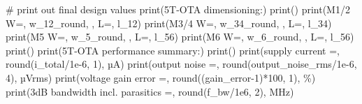 \documentclass[
  a4paper,
  DIV=11,
  numbers=noendperiod]{scrartcl}
\newenvironment{Shaded}{\begin{snugshade}}{\end{snugshade}}
\newcommand{\BuiltInTok}[1]{\textcolor[rgb]{0.00,0.23,0.31}{#1}}
\newcommand{\CommentTok}[1]{\textcolor[rgb]{0.37,0.37,0.37}{#1}}
\newcommand{\DecValTok}[1]{\textcolor[rgb]{0.68,0.00,0.00}{#1}}
\newcommand{\FloatTok}[1]{\textcolor[rgb]{0.68,0.00,0.00}{#1}}
\newcommand{\NormalTok}[1]{\textcolor[rgb]{0.00,0.23,0.31}{#1}}
\newcommand{\OperatorTok}[1]{\textcolor[rgb]{0.37,0.37,0.37}{#1}}
\newcommand{\StringTok}[1]{\textcolor[rgb]{0.13,0.47,0.30}{#1}}
\begin{document}
\begin{tcolorbox}
\begin{Shaded}
\begin{Highlighting}[]
\CommentTok{\# print out final design values}
\BuiltInTok{print}\NormalTok{(}\StringTok{\textquotesingle{}5T{-}OTA dimensioning:\textquotesingle{}}\NormalTok{)}
\BuiltInTok{print}\NormalTok{(}\StringTok{\textquotesingle{}{-}{-}{-}{-}{-}{-}{-}{-}{-}{-}{-}{-}{-}{-}{-}{-}{-}{-}{-}{-}\textquotesingle{}}\NormalTok{)}
\BuiltInTok{print}\NormalTok{(}\StringTok{\textquotesingle{}M1/2 W=\textquotesingle{}}\NormalTok{, w\_12\_round, }\StringTok{\textquotesingle{}, L=\textquotesingle{}}\NormalTok{, l\_12)}
\BuiltInTok{print}\NormalTok{(}\StringTok{\textquotesingle{}M3/4 W=\textquotesingle{}}\NormalTok{, w\_34\_round, }\StringTok{\textquotesingle{}, L=\textquotesingle{}}\NormalTok{, l\_34)}
\BuiltInTok{print}\NormalTok{(}\StringTok{\textquotesingle{}M5   W=\textquotesingle{}}\NormalTok{, w\_5\_round, }\StringTok{\textquotesingle{}, L=\textquotesingle{}}\NormalTok{, l\_56)}
\BuiltInTok{print}\NormalTok{(}\StringTok{\textquotesingle{}M6   W=\textquotesingle{}}\NormalTok{, w\_6\_round, }\StringTok{\textquotesingle{}, L=\textquotesingle{}}\NormalTok{, l\_56)}
\BuiltInTok{print}\NormalTok{()}
\BuiltInTok{print}\NormalTok{(}\StringTok{\textquotesingle{}5T{-}OTA performance summary:\textquotesingle{}}\NormalTok{)}
\BuiltInTok{print}\NormalTok{(}\StringTok{\textquotesingle{}{-}{-}{-}{-}{-}{-}{-}{-}{-}{-}{-}{-}{-}{-}{-}{-}{-}{-}{-}{-}{-}{-}{-}{-}{-}{-}{-}\textquotesingle{}}\NormalTok{)}
\BuiltInTok{print}\NormalTok{(}\StringTok{\textquotesingle{}supply current =\textquotesingle{}}\NormalTok{, }\BuiltInTok{round}\NormalTok{(i\_total}\OperatorTok{/}\FloatTok{1e{-}6}\NormalTok{, }\DecValTok{1}\NormalTok{), }\StringTok{\textquotesingle{}µA\textquotesingle{}}\NormalTok{)}
\BuiltInTok{print}\NormalTok{(}\StringTok{\textquotesingle{}output noise =\textquotesingle{}}\NormalTok{, }\BuiltInTok{round}\NormalTok{(output\_noise\_rms}\OperatorTok{/}\FloatTok{1e{-}6}\NormalTok{, }\DecValTok{4}\NormalTok{), }\StringTok{\textquotesingle{}µVrms\textquotesingle{}}\NormalTok{)}
\BuiltInTok{print}\NormalTok{(}\StringTok{\textquotesingle{}voltage gain error =\textquotesingle{}}\NormalTok{, }\BuiltInTok{round}\NormalTok{((gain\_error}\OperatorTok{{-}}\DecValTok{1}\NormalTok{)}\OperatorTok{*}\DecValTok{100}\NormalTok{, }\DecValTok{1}\NormalTok{), }\StringTok{\textquotesingle{}\%\textquotesingle{}}\NormalTok{)}
\BuiltInTok{print}\NormalTok{(}\StringTok{\textquotesingle{}{-}3dB bandwidth incl. parasitics =\textquotesingle{}}\NormalTok{, }\BuiltInTok{round}\NormalTok{(f\_bw}\OperatorTok{/}\FloatTok{1e6}\NormalTok{, }\DecValTok{2}\NormalTok{), }\StringTok{\textquotesingle{}MHz\textquotesingle{}}\NormalTok{)}

\end{Highlighting}
\end{Shaded}
\end{tcolorbox}
\end{document}
